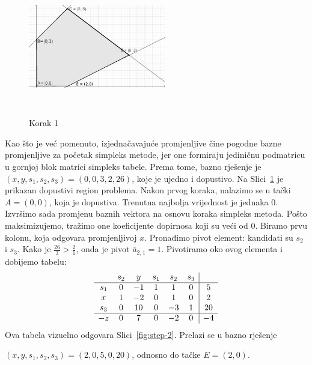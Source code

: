 \documentclass[b5paper, utf8, 11pt, colorlinks]{book}
\theoremstyle{definition}
\begin{document}
\begin{figure}[H]
	\centering
	\includegraphics[width=170pt, height=170pt]{simpleks-primjer-2-sl1.eps}
	\caption{Korak 1}
	\label{fig:step-1}
\end{figure}
Kao što je već pomenuto, izjednačavajuće promjenljive čine pogodne bazne promjenljive za početak simpleks metode, jer one formiraju jediničnu podmatricu u gornjoj blok matrici 
simpleks tabele. Prema tome, bazno rješenje je
$(x, y, s_1, s_2, s_3) = (0, 0, 3, 2, 26)$, koje je ujedno i dopustivo.
Na Slici~\ref{fig:step-1} je prikazan dopustivi region problema. Nakon prvog koraka, nalazimo se u tački $A=(0,0)$, koja je dopustiva. Trenutna najbolja vrijednost je jednaka 0.
Izvršimo sada promjenu baznih vektora na osnovu  koraka simpleks metoda. Pošto maksimizujemo, 
tražimo one koeficijente dopirnosa koji su veći od 0. Biramo prvu kolonu, koja odgovara promjenljivoj $x$. Pronađimo 
pivot element: kandidati su $s_2$ i $s_3$.
Kako je $\frac{26}{3} > \frac{2}{1}$, onda je  pivot $\overline{a}_{2, 1} = 1$. Pivotiramo oko ovog elementa i dobijemo tabelu:
$$\begin{array}{cccccc| c}
	& s_2  & y  & s_1  & s_2 & s_3 &    \\ \hline
	s_1 & 0    & -1  & 1  & 1 & 0  &  5     \\
	x   & 1    & -2  & 0  & 1 & 0  &  2     \\
	s_3 & 0    & 10   &  0  & -3 & 1 & 20   \\ \hline
	-z  & 0    &  7   & 0   & -2 & 0 & -4   \\ 
\end{array}
$$ 
Ova tabela vizuelno odgovara Slici~\ref{fig:step-2}. Prelazi se u bazno rješenje 

\noindent $(x,y, s_1, s_2, s_3)=(2, 0, 5, 0 ,20)$, odnosno do tačke $E=(2, 0)$. 
\end{document}

